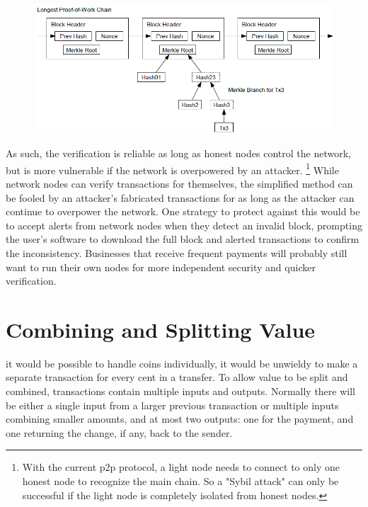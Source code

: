 \documentclass[nohyper]{tufte-handout}
\begin{document}
\begin{figure}[!h]
\centering
\includegraphics[width=\linewidth]{spv.png}

\end{figure}

As such, the verification is reliable as long as honest nodes control
the network, but is more vulnerable if the network is overpowered by an
attacker.  \footnote[][-0.5in]{With the current p2p protocol, a light node needs to connect to only one honest node to recognize the main chain.  So a "Sybil attack" can only be successful if the light node is completely isolated from honest nodes.} While network nodes can verify transactions for themselves,
the simplified method can be fooled by an attacker's fabricated
transactions for as long as the attacker can continue to overpower the
network. One strategy to protect against this would be to accept alerts
from network nodes when they detect an invalid block, prompting the
user's software to download the full block and alerted transactions to
confirm the inconsistency. Businesses that receive frequent payments
will probably still want to run their own nodes for more independent
security and quicker verification.

\section{Combining and Splitting
Value}\label{combining-and-splitting-value}

 it would be possible to handle coins individually, it would be
unwieldy to make a separate transaction for every cent in a transfer. To
allow value to be split and combined, transactions contain multiple
inputs and outputs. Normally there will be either a single input from a
larger previous transaction or multiple inputs combining smaller
amounts, and at most two outputs: one for the payment, and one returning
the change, if any, back to the sender.
\end{document}
